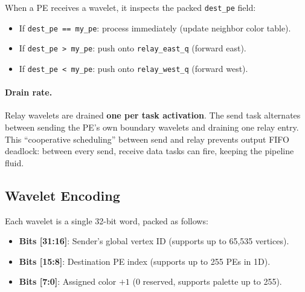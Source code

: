 \documentclass[11pt,letterpaper]{article}
\begin{document}
When a PE receives a wavelet, it inspects the packed \texttt{dest\_pe} field:
\begin{itemize}[nosep]
  \item If \texttt{dest\_pe == my\_pe}: process immediately (update neighbor color table).
  \item If \texttt{dest\_pe > my\_pe}: push onto \texttt{relay\_east\_q} (forward east).
  \item If \texttt{dest\_pe < my\_pe}: push onto \texttt{relay\_west\_q} (forward west).
\end{itemize}

\paragraph{Drain rate.} Relay wavelets are drained \textbf{one per task activation}. The send task alternates between sending the PE's own boundary wavelets and draining one relay entry. This ``cooperative scheduling'' between send and relay prevents output FIFO deadlock: between every send, receive data tasks can fire, keeping the pipeline fluid.

\subsection{Wavelet Encoding}

Each wavelet is a single 32-bit word, packed as follows:
\begin{center}
\end{center}

\begin{itemize}[nosep]
  \item \textbf{Bits [31:16]}: Sender's global vertex ID (supports up to 65,535 vertices).
  \item \textbf{Bits [15:8]}: Destination PE index (supports up to 255 PEs in 1D).
  \item \textbf{Bits [7:0]}: Assigned color $+ 1$ (0 reserved, supports palette up to 255).
\end{itemize}
\end{document}
